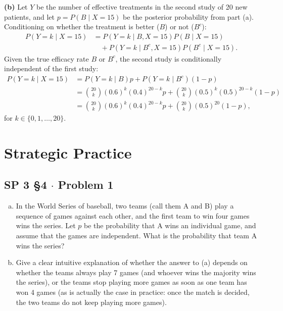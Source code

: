 \documentclass[11pt,a4paper]{article}
\begin{document}
\vspace{4pt}
\noindent \textbf{(b)} Let $Y$ be the number of effective treatments in the second study of 20 new patients, and let $p = P(B \mid X = 15)$ be the posterior probability from part (a). Conditioning on whether the treatment is better ($B$) or not ($B^c$):
\begin{align*}
P(Y = k \mid X = 15) &= P(Y = k \mid B, X = 15) P(B \mid X = 15) \\
&\quad + P(Y = k \mid B^c, X = 15) P(B^c \mid X = 15).
\end{align*}
Given the true efficacy rate $B$ or $B^c$, the second study is conditionally independent of the first study:
\begin{align*}
P(Y = k \mid X = 15) &= P(Y = k \mid B) p + P(Y = k \mid B^c) (1 - p) \\
&= \binom{20}{k} (0.6)^k (0.4)^{20-k} p + \binom{20}{k} (0.5)^k (0.5)^{20-k} (1 - p) \\
&= \binom{20}{k} (0.6)^k (0.4)^{20-k} p + \binom{20}{k} (0.5)^{20} (1 - p),
\end{align*}
for $k \in \{0, 1, \dots, 20\}$.

\vspace{15pt}
\section{Strategic Practice}

\subsection{SP 3 \S4 $\cdot$ Problem 1}
\begin{tcolorbox}[title={SP 3 \S4 $\cdot$ Problem 1}]
\begin{enumerate}[(a)]
\item In the World Series of baseball, two teams (call them A and B) play a sequence of games against each other, and the first team to win four games wins the series. Let $p$ be the probability that A wins an individual game, and assume that the games are independent. What is the probability that team A wins the series?
\item Give a clear intuitive explanation of whether the answer to (a) depends on whether the teams always play 7 games (and whoever wins the majority wins the series), or the teams stop playing more games as soon as one team has won 4 games (as is actually the case in practice: once the match is decided, the two teams do not keep playing more games).
\end{enumerate}
\end{tcolorbox}
\end{document}
